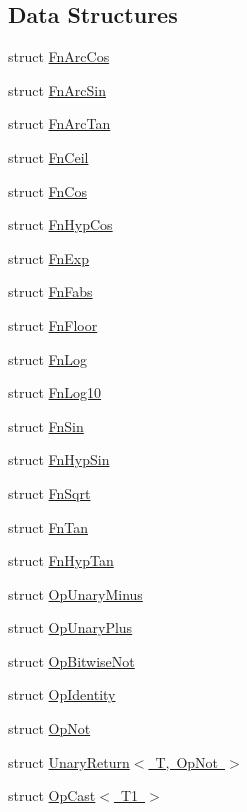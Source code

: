 \subsection*{Data Structures}
\begin{DoxyCompactItemize}
\item 
struct \mbox{\hyperlink{structFnArcCos}{Fn\+Arc\+Cos}}
\item 
struct \mbox{\hyperlink{structFnArcSin}{Fn\+Arc\+Sin}}
\item 
struct \mbox{\hyperlink{structFnArcTan}{Fn\+Arc\+Tan}}
\item 
struct \mbox{\hyperlink{structFnCeil}{Fn\+Ceil}}
\item 
struct \mbox{\hyperlink{structFnCos}{Fn\+Cos}}
\item 
struct \mbox{\hyperlink{structFnHypCos}{Fn\+Hyp\+Cos}}
\item 
struct \mbox{\hyperlink{structFnExp}{Fn\+Exp}}
\item 
struct \mbox{\hyperlink{structFnFabs}{Fn\+Fabs}}
\item 
struct \mbox{\hyperlink{structFnFloor}{Fn\+Floor}}
\item 
struct \mbox{\hyperlink{structFnLog}{Fn\+Log}}
\item 
struct \mbox{\hyperlink{structFnLog10}{Fn\+Log10}}
\item 
struct \mbox{\hyperlink{structFnSin}{Fn\+Sin}}
\item 
struct \mbox{\hyperlink{structFnHypSin}{Fn\+Hyp\+Sin}}
\item 
struct \mbox{\hyperlink{structFnSqrt}{Fn\+Sqrt}}
\item 
struct \mbox{\hyperlink{structFnTan}{Fn\+Tan}}
\item 
struct \mbox{\hyperlink{structFnHypTan}{Fn\+Hyp\+Tan}}
\item 
struct \mbox{\hyperlink{structOpUnaryMinus}{Op\+Unary\+Minus}}
\item 
struct \mbox{\hyperlink{structOpUnaryPlus}{Op\+Unary\+Plus}}
\item 
struct \mbox{\hyperlink{structOpBitwiseNot}{Op\+Bitwise\+Not}}
\item 
struct \mbox{\hyperlink{structOpIdentity}{Op\+Identity}}
\item 
struct \mbox{\hyperlink{structOpNot}{Op\+Not}}
\item 
struct \mbox{\hyperlink{structUnaryReturn_3_01T_00_01OpNot_01_4}{Unary\+Return$<$ T, Op\+Not $>$}}
\item 
struct \mbox{\hyperlink{structOpCast}{Op\+Cast$<$ T1 $>$}}

\end{DoxyCompactItemize}
